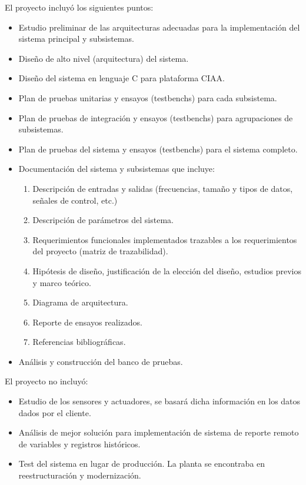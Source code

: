 El proyecto incluyó los siguientes puntos:
\begin{itemize}
	\item Estudio preliminar de las arquitecturas adecuadas para la implementación del sistema principal y subsistemas.
	\item Diseño de alto nivel (arquitectura) del sistema.
	\item Diseño del sistema en lenguaje C para plataforma CIAA.
	\item Plan de pruebas unitarias y ensayos (testbenchs) para cada subsistema.
	\item Plan de pruebas de integración y ensayos (testbenchs) para agrupaciones de subsistemas.
	\item Plan de pruebas del sistema y ensayos (testbenchs) para el sistema completo.
	\item Documentación del sistema y subsistemas que incluye:
	\begin{enumerate}
		\item Descripción de entradas y salidas (frecuencias, tamaño y tipos de datos, señales de control, etc.)
		\item Descripción de parámetros del sistema.
		\item Requerimientos funcionales implementados trazables a los requerimientos del proyecto (matriz de trazabilidad).
		\item Hipótesis de diseño, justificación de la elección del diseño, estudios previos y marco teórico.
		\item Diagrama de arquitectura.
		\item Reporte de ensayos realizados.
		\item Referencias bibliográficas.
	\end{enumerate}
	\item Análisis y construcción del banco de pruebas.
\end{itemize}

El proyecto no incluyó: 
\begin{itemize}
	\item Estudio de los sensores y actuadores, se basará dicha información en los datos dados por el cliente. 
	\item Análisis de mejor solución para implementación de sistema de reporte remoto de variables y registros históricos. 
	\item Test del sistema en lugar de producción. La planta se encontraba en reestructuración y modernización.
\end{itemize}



